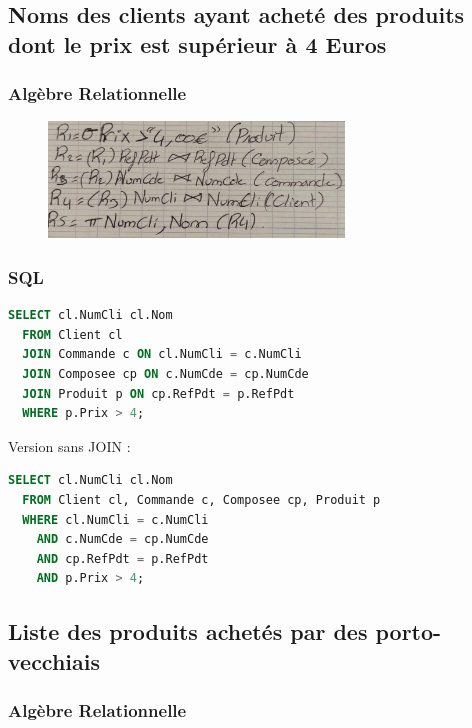 \documentclass{article}
\begin{document}
\subsection{Noms des clients ayant acheté des produits dont le prix est supérieur à 4 Euros}

\subsubsection{Algèbre Relationnelle}

\begin{figure}[H]
  \centering
  \includegraphics[width=0.7\textwidth]{alg/9.png}
  \label{fig:alg-rel}
\end{figure}

\subsubsection{SQL}

\begin{lstlisting}[language=SQL]
  SELECT cl.NumCli cl.Nom 
  FROM Client cl
  JOIN Commande c ON cl.NumCli = c.NumCli
  JOIN Composee cp ON c.NumCde = cp.NumCde
  JOIN Produit p ON cp.RefPdt = p.RefPdt
  WHERE p.Prix > 4;
\end{lstlisting}

Version sans JOIN :

\begin{lstlisting}[language=SQL]
  SELECT cl.NumCli cl.Nom 
  FROM Client cl, Commande c, Composee cp, Produit p
  WHERE cl.NumCli = c.NumCli 
    AND c.NumCde = cp.NumCde 
    AND cp.RefPdt = p.RefPdt 
    AND p.Prix > 4;
\end{lstlisting}

\subsection{Liste des produits achetés par des porto-vecchiais}

\subsubsection{Algèbre Relationnelle}
\end{document}
